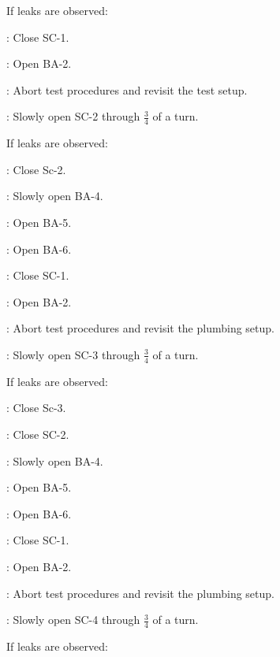 \begin{checklist}
    \item If leaks are observed:
    \begin{checklist}
            \item \primary{}: Close SC-1. 
            \item \primary{}: Open BA-2. 
            \item \ops{}: Abort test procedures and revisit the test setup.
    \end{checklist}
    \item \primary{}: Slowly open SC-2 through $\frac{3}{4}$ of a turn.
    \item If leaks are observed:
    \begin{checklist}
            \item \primary{}: Close Sc-2. 
            \item \primary{}: Slowly open BA-4.
            \item \primary{}: Open BA-5. 
            \item \primary{}: Open BA-6. 
            \item \primary{}: Close SC-1.
            \item \primary{}: Open BA-2.
            \item \ops{}: Abort test procedures and revisit the plumbing setup. 
    \end{checklist}
    \item \primary{}: Slowly open SC-3 through $\frac{3}{4}$ of a turn.
    \item If leaks are observed:
    \begin{checklist}
            \item \primary{}: Close Sc-3.
            \item \primary{}: Close SC-2.
            \item \primary{}: Slowly open BA-4.
            \item \primary{}: Open BA-5. 
            \item \primary{}: Open BA-6. 
            \item \primary{}: Close SC-1.
            \item \primary{}: Open BA-2.
            \item \ops{}: Abort test procedures and revisit the plumbing setup. 
    \end{checklist}
    \item \primary{}: Slowly open SC-4 through $\frac{3}{4}$ of a turn.
    \item If leaks are observed:
    \begin{checklist}

\end{checklist}
\end{checklist}
